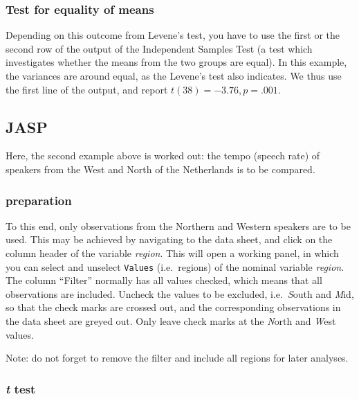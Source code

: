 \documentclass[
]{book}
\begin{document}
\hypertarget{test-for-equality-of-means}{%
\subsubsection{Test for equality of means}\label{test-for-equality-of-means}}

Depending on this outcome from Levene's test, you have to use the first
or the second row of the output of the Independent Samples Test
(a test which investigates whether the means from the two groups are equal).
In this example, the variances are around equal, as the
Levene's test also indicates. We thus use the first line of the output,
and report \(t(38)=-3.76, p=.001\).

\hypertarget{sec:JASP-ttest-unpaired}{%
\subsection{JASP}\label{sec:JASP-ttest-unpaired}}

Here, the second example above is worked out: the tempo (speech rate) of speakers from the West and North of the Netherlands is to be compared.

\hypertarget{preparation}{%
\subsubsection{preparation}\label{preparation}}

To this end, only observations from the Northern and Western speakers are to be used. This may be achieved by navigating to the data sheet, and click on the column header of the variable \emph{region}. This will open a working panel, in which you can select and unselect \texttt{Values} (i.e.~regions) of the nominal variable \emph{region}. The column ``Filter'' normally has all values checked, which means that all observations are included. Uncheck the values to be excluded, i.e.~\emph{S}outh and \emph{M}id, so that the check marks are crossed out, and the corresponding observations in the data sheet are greyed out. Only leave check marks at the \emph{N}orth and \emph{W}est values.

Note: do not forget to remove the filter and include all regions for later analyses.

\hypertarget{t-test}{%
\subsubsection{\texorpdfstring{\emph{t} test}{t test}}\label{t-test}}
\end{document}
